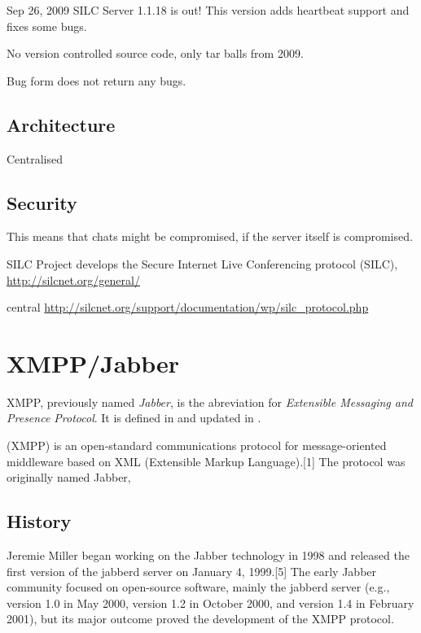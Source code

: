 Sep 26, 2009
SILC Server 1.1.18 is out! This version adds heartbeat support and fixes some bugs. 

No version controlled source code, only tar balls from 2009.

Bug form does not return any bugs.
\subsection{Architecture}
Centralised
\subsection{Security}
This means that chats might be compromised, if the server itself is compromised. 

SILC Project develops the Secure Internet Live Conferencing protocol (SILC),
\url{http://silcnet.org/general/}

central
\url{http://silcnet.org/support/documentation/wp/silc_protocol.php}


\section{XMPP/Jabber}
XMPP, previously named \textit{Jabber}, is the abreviation for
\textit{Extensible Messaging and Presence Protocol}.
It is defined in \cite{rfc3920,rfc3921,rfc3922,rfc3923,rfc4622,rfc4854,rfc4979}
and updated in \cite{rfc6120,rfc6121}.

(XMPP) is an open-standard communications protocol for message-oriented middleware based on XML (Extensible Markup Language).[1] The protocol was originally named Jabber,



\subsection{History}
Jeremie Miller began working on the Jabber technology in 1998 and released the first version of the jabberd server on January 4, 1999.[5] The early Jabber community focused on open-source software, mainly the jabberd server (e.g., version 1.0 in May 2000, version 1.2 in October 2000, and version 1.4 in February 2001), but its major outcome proved the development of the XMPP protocol.

